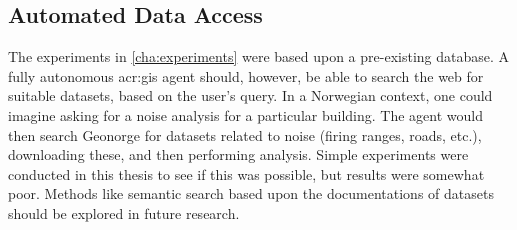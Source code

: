 \subsection{Automated Data Access}

The experiments in \autoref{cha:experiments} were based upon a pre-existing database. A fully autonomous \acrshort{acr:gis} agent should, however, be able to search the web for suitable datasets, based on the user's query. In a Norwegian context, one could imagine asking for a noise analysis for a particular building. The agent would then search Geonorge for datasets related to noise (firing ranges, roads, etc.), downloading these, and then performing analysis. Simple experiments were conducted in this thesis to see if this was possible, but results were somewhat poor. Methods like semantic search based upon the documentations of datasets should be explored in future research.